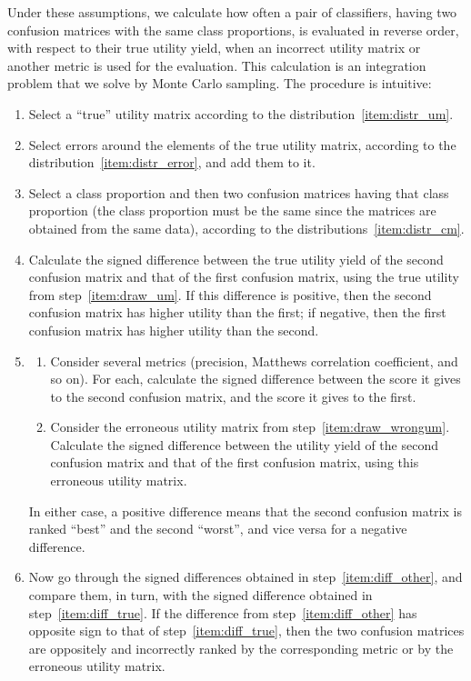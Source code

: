 \documentclass[\ifafour a4paper,12pt,\else a5paper,10pt,\fi%
onecolumn,oneside,article,%
british%
]{memoir}
\theoremstyle{remark}
\theoremstyle{innote}
\renewcommand*{\|}[1][]{\nonscript\:#1\vert\nonscript\:\mathopen{}}
\begin{document}
Under these assumptions, we calculate how often a pair of classifiers, having two confusion matrices with the same class proportions, is evaluated in reverse order, with respect to their true utility yield, when an incorrect utility matrix or another metric is used for the evaluation. This calculation is an integration problem that we solve by Monte Carlo sampling. The procedure is intuitive:
\begin{enumerate}[label=\arabic*.,ref=\arabic*]
\item\label{item:draw_um} Select a \enquote{true} utility matrix according to the distribution~\ref{item:distr_um}.
\item\label{item:draw_wrongum} Select errors around the elements of the true utility matrix, according to the distribution~\ref{item:distr_error}, and add them to it.
\item\label{item:draw_cm} Select a class proportion and then two confusion matrices having that class proportion (the class proportion must be the same since the matrices are obtained from the same data), according to the distributions~\ref{item:distr_cm}.
\item\label{item:diff_true} Calculate the signed difference between the true utility yield of the second confusion matrix and that of the first confusion matrix, using the true utility from step~\ref{item:draw_um}. If this difference is positive, then the second confusion matrix has higher utility than the first; if negative, then the first confusion matrix has higher utility than the second.
\item\label{item:diff_other}
    \begin{enumerate}[label=\alph*.]
\item Consider several metrics (precision, Matthews correlation coefficient, and so on). For each, calculate the signed difference between the score it gives to the second confusion matrix, and the score it gives to the first.
\item Consider the erroneous utility matrix from step~\ref{item:draw_wrongum}. Calculate the signed difference between the utility yield of the second confusion matrix and that of the first confusion matrix, using this erroneous utility matrix.
\end{enumerate}
In either case, a positive difference means that the second confusion matrix is ranked \enquote{best} and the second \enquote{worst}, and vice versa for a negative difference.
\item Now go through the signed differences obtained in step~\ref{item:diff_other}, and compare them, in turn, with the signed difference obtained in step~\ref{item:diff_true}. If the difference from step~\ref{item:diff_other} has opposite sign to that of step~\ref{item:diff_true}, then the two confusion matrices are oppositely and incorrectly ranked by the corresponding metric or by the erroneous utility matrix.
\end{enumerate}
\end{document}
